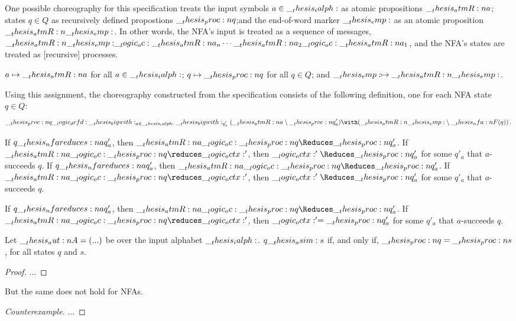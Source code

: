 One possible choreography for this specification treats the input symbols $a \in \__thesis_ialph:$ as atomic propositions $\__thesis_atmR:n {a}$; states $q \in Q$ as recursively defined propostions $\__thesis_proc:n {q}$;and the end-of-word marker $\__thesis_emp:$ as an atomic proposition $\__thesis_atmR:n {\__thesis_emp:}$.
In other words, the \ac{NFA}'s input is treated as a sequence of messages, $\__thesis_atmR:n {\__thesis_emp:} \__logic_oc: \__thesis_atmR:n {a}_n \dotsm \__thesis_atmR:n {a}_2 \__logic_oc: \__thesis_atmR:n {a}_1$, and the \ac{NFA}'s states are treated as [recursive] processes.

$a \mapsto \__thesis_atmR:n {a}$ for all $a \in \__thesis_ialph:$; $q \mapsto \__thesis_proc:n {q}$ for all $q \in Q$; and $\__thesis_emp: \mapsto \__thesis_atmR:n {\__thesis_emp:}$.

Using this assignment, the choreography constructed from the specification consists of the following definition, one for each \ac{NFA} state $q \in Q$:
\begin{equation*}
  \proc{q} \defd \bigwith_{a \in \ialph} \bigwith_{q\smash{'_a}} (\atmR{a} \limp \proc{q}'_a) \with (\atmR{\emp} \limp \nfa{F}(q))
  \,.
\end{equation*}

\begin{corollary}
  If $q \nfareduces[a] q'_a$, then $\atmR{a} \oc \proc{q} \Reduces \proc{q}'_a$.
  If $\atmR{a} \oc \proc{q} \reduces \octx'$, then $\octx' \Reduces \proc{q}'_a$ for some $q'_a$ that $a$-succeeds $q$.
  If $q \nfareduces[a] q'_a$, then $\atmR{a} \oc \proc{q} \Reduces \proc{q}'_a$.
  If $\atmR{a} \oc \proc{q} \reduces \octx'$, then $\octx' \Reduces \proc{q}'_a$ for some $q'_a$ that $a$-succeeds $q$.
\end{corollary}

\begin{corollary}
  If $q \nfareduces[a] q'_a$, then $\atmR{a} \oc \proc{q} \Reduces \proc{q}'_a$.
  If $\atmR{a} \oc \proc{q} \reduces \octx'$, then $\__logic_octx:' = \__thesis_proc:n {q}'_a$ for some $q'_a$ that $a$-succeeds $q$.
\end{corollary}


\begin{theorem}
  Let $\__thesis_aut:n {A} = (...)$ be  over the input alphabet $\__thesis_ialph:$.
  $q \__thesis_asim: s$ if, and only if, $\__thesis_proc:n {q} = \__thesis_proc:n {s}$, for all states $q$ and $s$.
\end{theorem}
\begin{proof}
  ...
\end{proof}

But the same does not hold for \acp{NFA}.
\begin{proof}[Counterexample]
  ...
\end{proof}

